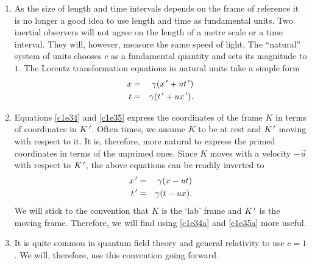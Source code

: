 \begin{enumerate}
\item As the size of length and time intervals depends on the frame of reference
it is no longer a good idea to use length and time as fundamental units. Two
inertial observers will not agree on the length of a metre scale or a time 
interval. They will, however, measure the same speed of light. The ``natural''
system of units chooses $c$ as a fundamental quantity and sets its magnitude
to $1$. The Lorentz transformation equations in natural units take a simple 
form
\begin{eqnarray}
x &=& \gamma(x^{\,\prime} + ut^{\,\prime}) \label{c1e34} \\
t &=& \gamma(t^{\,\prime} + ux^{\,\prime}). \label{c1e35} 
\end{eqnarray}

\item Equations \eqref{c1e34} and \eqref{c1e35} express the coordinates of the
frame $K$ in terms of coordinates in $K^{\,\prime}$. Often times, we assume $K$ to be
at rest and $K^{\,\prime}$ moving with respect to it. It is, therefore, more natural
to express the primed coordinates in terms of the unprimed ones. Since $K$
moves with a velocity $-\vec{u}$ with respect to $K^{\,\prime}$, the above equations
can be readily inverted to
\begin{eqnarray}
x^{\,\prime} &=& \gamma(x - ut) \label{c1e34a} \\
t^{\,\prime} &=& \gamma(t - ux). \label{c1e35a}
\end{eqnarray}
We will stick to the convention that $K$ is the `lab' frame and $K^{\,\prime}$ is the
moving frame. Therefore, we will find using \eqref{c1e34a} and \eqref{c1e35a}
more useful.

\item It is quite common in quantum field theory and general relativity to 
use $c = 1$. We will, therefore, use this convention going forward.


\end{enumerate}
